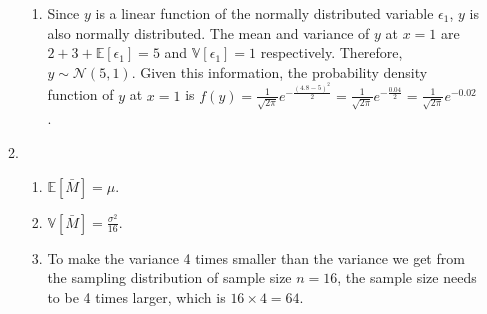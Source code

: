 \documentclass{article}
\begin{document}
\begin{enumerate}
\begin{enumerate}
\begin{enumerate}
          \item Since $y$ is a linear function of the normally distributed variable $\epsilon_1$, $y$ is also normally distributed. The mean and variance of $y$ at $x=1$ are $2 + 3 + \mathbb{E}[\epsilon_1] = 5$ and $\mathbb{V}[\epsilon_1] = 1$ respectively. Therefore, $y \sim \mathcal{N}(5, 1)$. Given this information, the probability density function of $y$ at $x=1$ is $f(y) = \frac{1}{\sqrt{2\pi}} e^{-\frac{(4.8-5)^2}{2}}=\frac{1}{\sqrt{2\pi}} e^{-\frac{0.04}{2}}=\frac{1}{\sqrt{2\pi}} e^{-0.02}$.
        \end{enumerate}
      \item
        \begin{enumerate}
          \item $\mathbb{E}[\bar M] = \mu$.
          \item $\mathbb{V}[\bar M] = \frac{\sigma^2}{16}$.
          \item To make the variance 4 times smaller than the variance we get from the sampling distribution of sample size $n=16$, the sample size needs to be 4 times larger, which is $16 \times 4 = 64$.
        \end{enumerate}
    \end{enumerate}
\end{enumerate}
\end{document}
